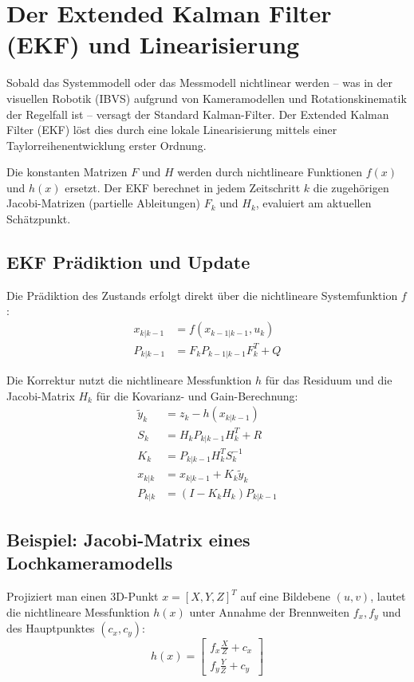 \documentclass{article}
\begin{document}
\section{Der Extended Kalman Filter (EKF) und Linearisierung}
\label{sec:ekf}

Sobald das Systemmodell oder das Messmodell nichtlinear werden -- was in der visuellen Robotik (IBVS) aufgrund von Kameramodellen und Rotationskinematik der Regelfall ist -- versagt der Standard Kalman-Filter. Der Extended Kalman Filter (EKF) löst dies durch eine lokale Linearisierung mittels einer Taylorreihenentwicklung erster Ordnung.

Die konstanten Matrizen $F$ und $H$ werden durch nichtlineare Funktionen $f(x)$ und $h(x)$ ersetzt. Der EKF berechnet in jedem Zeitschritt $k$ die zugehörigen Jacobi-Matrizen (partielle Ableitungen) $F_k$ und $H_k$, evaluiert am aktuellen Schätzpunkt.




\subsection{EKF Prädiktion und Update}
Die Prädiktion des Zustands erfolgt direkt über die nichtlineare Systemfunktion $f$:
\begin{align}
    x_{k|k-1} &= f(x_{k-1|k-1}, u_k) \\
    P_{k|k-1} &= F_k P_{k-1|k-1} F_k^T + Q
\end{align}

Die Korrektur nutzt die nichtlineare Messfunktion $h$ für das Residuum und die Jacobi-Matrix $H_k$ für die Kovarianz- und Gain-Berechnung:
\begin{align}
    \tilde{y}_k &= z_k - h(x_{k|k-1}) \\
    S_k &= H_k P_{k|k-1} H_k^T + R \\
    K_k &= P_{k|k-1} H_k^T S_k^{-1} \\
    x_{k|k} &= x_{k|k-1} + K_k \tilde{y}_k \\
    P_{k|k} &= (I - K_k H_k) P_{k|k-1}
\end{align}




\subsection{Beispiel: Jacobi-Matrix eines Lochkameramodells}
Projiziert man einen 3D-Punkt $x = [X, Y, Z]^T$ auf eine Bildebene $(u,v)$, lautet die nichtlineare Messfunktion $h(x)$ unter Annahme der Brennweiten $f_x, f_y$ und des Hauptpunktes $(c_x, c_y)$:
\begin{equation}
    h(x) = \begin{bmatrix} f_x \frac{X}{Z} + c_x \\ f_y \frac{Y}{Z} + c_y \end{bmatrix}
\end{equation}
\end{document}
